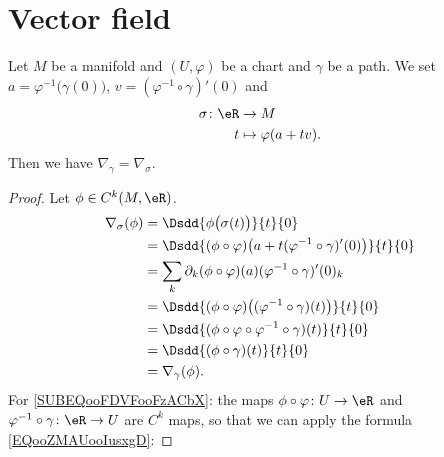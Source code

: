 \section{Vector field}

\begin{lemma}       \label{LEMooXFNQooXwCMNB}
	Let \( M\) be a manifold and \( (U,\varphi)\) be a chart and \( \gamma\) be a path. We set \( a=\varphi^{-1}\big( \gamma(0) \big)\), \(v= (\varphi^{-1}\circ\gamma)'(0)\) and
	\begin{equation}
		\begin{aligned}
			\sigma\colon \eR & \to M                  \\
			t                & \mapsto \varphi(a+tv).
		\end{aligned}
	\end{equation}
	Then we have \( \nabla_{\gamma}=\nabla_{\sigma}\).
\end{lemma}

\begin{proof}
	Let \( \phi\in C^k(M, \eR)\).
	\begin{subequations}
		\begin{align}
			\nabla_{\sigma}(\phi) & =\Dsdd{ \phi\big( \sigma(t) \big) }{t}{0}                                                          \\
			                      & =\Dsdd{ (\phi\circ \varphi)\big( a+t(\varphi^{-1}\circ\gamma)'(0) \big) }{t}{0}                    \\
			                      & =\sum_k\partial_k(\phi\circ\varphi)(a)(\varphi^{-1}\circ\gamma)'(0)_k  \label{SUBEQooFDVFooFzACbX} \\
			                      & =\Dsdd{ (\phi\circ\varphi)\big( (\varphi^{-1}\circ\gamma)(t) \big) }{t}{0}                         \\
			                      & =\Dsdd{ (\phi\circ\varphi\circ\varphi^{-1}\circ\gamma)(t) }{t}{0}                                  \\
			                      & =\Dsdd{ (\phi\circ\gamma)(t) }{t}{0}                                                               \\
			                      & =\nabla_{\gamma}(\phi).
		\end{align}
	\end{subequations}
	For \eqref{SUBEQooFDVFooFzACbX}: the maps \( \phi\circ\varphi\colon U\to \eR\) and \( \varphi^{-1}\circ\gamma\colon \eR\to U\) are \( C^k\) maps, so that we can apply the formula \eqref{EQooZMAUooIusxgD}:
\end{proof}

